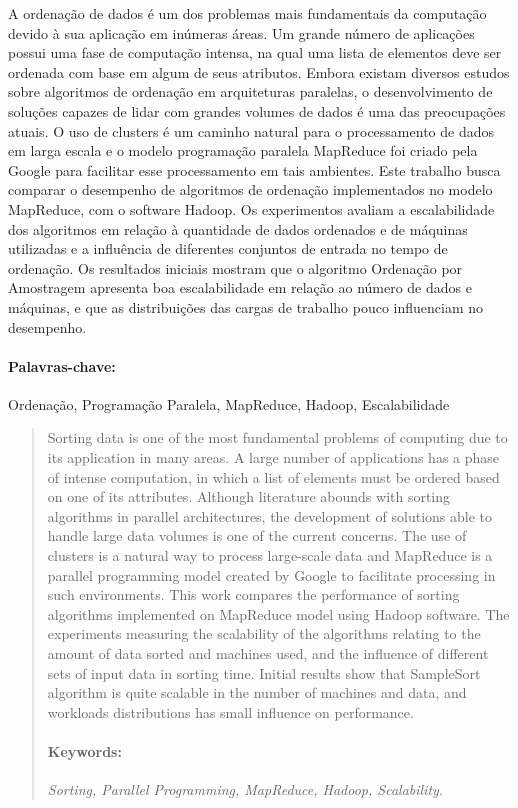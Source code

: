 \begin{resumo}

A ordenação de dados é um dos problemas mais fundamentais da computação devido à sua aplicação em inúmeras áreas. Um grande número de aplicações possui uma fase de computação intensa, na qual uma lista de elementos deve ser ordenada com base em algum de seus atributos. Embora existam diversos estudos sobre algoritmos de ordenação em arquiteturas paralelas, o desenvolvimento de soluções capazes de lidar com grandes volumes de dados é uma das preocupações atuais. O uso de clusters é um caminho natural para o processamento de dados em larga escala e o modelo programação paralela MapReduce foi criado pela Google para facilitar esse processamento em tais ambientes. Este trabalho busca comparar o desempenho de algoritmos de ordenação implementados no modelo MapReduce, com o software Hadoop.  Os experimentos avaliam a escalabilidade dos algoritmos em relação à quantidade de dados ordenados e de máquinas utilizadas e a influência de diferentes conjuntos de entrada no tempo de ordenação. Os resultados iniciais mostram que o algoritmo Ordenação por Amostragem apresenta boa escalabilidade em relação ao número de dados e máquinas, e que as distribuições das cargas de trabalho pouco influenciam no desempenho. 
    
	\paragraph{Palavras-chave:} Ordenação, Programação Paralela, MapReduce, Hadoop, Escalabilidade
\end{resumo}


\begin{abstract}

Sorting data is one of the most fundamental problems of computing due to its application in many areas. A large number of applications has a phase of intense computation, in which a list of elements must be ordered based on one of its attributes. Although literature abounds with sorting algorithms in parallel architectures, the development of solutions able to handle large data volumes is one of the current concerns. The use of clusters is a natural way to process large-scale data and MapReduce is a parallel programming model created by Google to facilitate processing in such environments. This work compares the performance of sorting algorithms implemented on MapReduce model using Hadoop software. 
The experiments measuring the scalability of the algorithms relating to the amount of data sorted and machines used, and the influence of different sets of input data in sorting time. Initial results show that SampleSort algorithm is quite scalable  in the number of machines and data, and workloads distributions has small influence on performance.
	
	\paragraph{Keywords:} \textit{Sorting, Parallel Programming, MapReduce, Hadoop, Scalability.}
\end{abstract}
